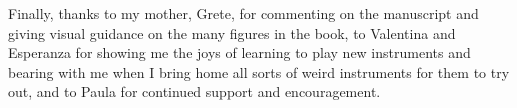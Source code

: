 Finally, thanks to my mother, Grete, for commenting on the manuscript and giving visual guidance on the many figures in the book, to Valentina and Esperanza for showing me the joys of learning to play new instruments and bearing with me when I bring home all sorts of weird instruments for them to try out, and to Paula for continued support and encouragement.

